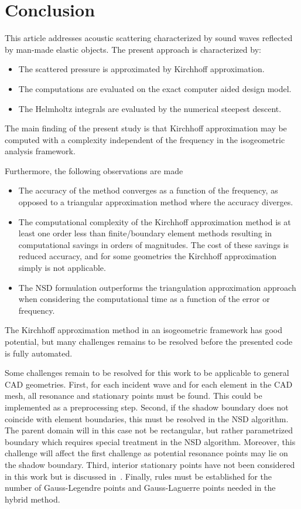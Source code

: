 \section{Conclusion}
\label{Sec4:conclusions}
This article addresses acoustic scattering characterized by sound waves reflected by man-made elastic objects. The present approach is characterized by:
\begin{itemize}
	\item The scattered pressure is approximated by Kirchhoff approximation.
	\item The computations are evaluated on the exact computer aided design model.
	\item The Helmholtz integrals are evaluated by the numerical steepest descent.
\end{itemize}

The main finding of the present study is that Kirchhoff approximation may be computed with a complexity independent of the frequency in the isogeometric analysis framework.

Furthermore, the following observations are made
\begin{itemize}
	\item The accuracy of the method converges as a function of the frequency, as opposed to a triangular approximation method where the accuracy diverges.
	\item The computational complexity of the Kirchhoff approximation method is at least one order less than finite/boundary element methods resulting in computational savings in orders of magnitudes. The cost of these savings is reduced accuracy, and for some geometries the Kirchhoff approximation simply is not applicable.
	\item The NSD formulation outperforms the triangulation approximation approach when considering the computational time as a function of the error or frequency.
\end{itemize}

The Kirchhoff approximation method in an isogeometric framework has good potential, but many challenges remains to be resolved before the presented code is fully automated.

Some challenges remain to be resolved for this work to be applicable to general CAD geometries. First, for each incident wave and for each element in the CAD mesh, all resonance and stationary points must be found. This could be implemented as a preprocessing step. Second, if the shadow boundary does not coincide with element boundaries, this must be resolved in the NSD algorithm. The parent domain will in this case not be rectangular, but rather parametrized boundary which requires special treatment in the NSD algorithm. Moreover, this challenge will affect the first challenge as potential resonance points may lie on the shadow boundary. Third, interior stationary points have not been considered in this work but is discussed in~\cite{Huybrechs2007tco}. Finally, rules must be established for the number of Gauss-Legendre points and Gauss-Laguerre points needed in the hybrid method.

